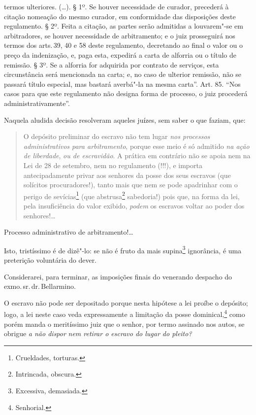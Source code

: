 {  termos ulteriores. (\ldots{}). § 1º. Se houver necessidade de curador,
  precederá à citação nomeação do mesmo curador, em conformidade das
  disposições deste regulamento. § 2º. Feita a citação, as partes serão
  admitidas a louvarem"-se em arbitradores, se houver necessidade de
  arbitramento; e o juiz prosseguirá nos termos dos arts.\,39, 40 e 58
  deste regulamento, decretando ao final o valor ou o preço da
  indenização, e, paga esta, expedirá a carta de alforria ou o título de
  remissão. § 3º. Se a alforria for adquirida por contrato de serviços,
  esta circunstância será mencionada na carta; e, no caso de ulterior
  remissão, não se passará título especial, mas bastará averbá"-la na
  mesma carta''. Art. 85. ``Nos casos para que este regulamento não designa
  forma de processo, o juiz procederá administrativamente''.}

Naquela aludida decisão resolveram aqueles juízes, sem saber o que
faziam, que:

\begin{quote}
O depósito preliminar do escravo não tem lugar \emph{nos processos
administrativos para arbitramento}, porque esse meio é só admitido
\emph{na ação de liberdade}, \emph{ou de escravidão}. A prática em
contrário não se apoia nem na Lei de 28 de setembro, nem no regulamento
(!!!), e importa antecipadamente privar aos senhores da posse dos seus
escravos (que solícitos procuradores!), tanto mais que nem se pode
apadrinhar com o perigo de sevícias\footnote{Crueldades, torturas.}
(que abstrusa\footnote{Intrincada, obscura.} sabedoria!) pois que, na
forma da lei, pela insuficiência do valor exibido, \emph{podem} os
escravos voltar ao poder dos senhores!\ldots{}
\end{quote}

Processo administrativo de arbitramento!\ldots{}

Isto, tristíssimo é de dizê"-lo: se não é fruto da mais supina\footnote{
  Excessiva, demasiada.} ignorância, é uma preterição voluntária do
dever.

Considerarei, para terminar, as imposições finais do venerando despacho
do exmo.\,sr.\,dr.\,Bellarmino.

O escravo não pode ser depositado porque nesta hipótese a lei proíbe o
depósito; logo, a lei neste caso veda expressamente a limitação da posse
dominical,\footnote{Senhorial.} como porém manda o meritíssimo juiz
que o senhor, por termo assinado nos autos, se obrigue \emph{a não
dispor} \emph{nem retirar o escravo do lugar do pleito? }

